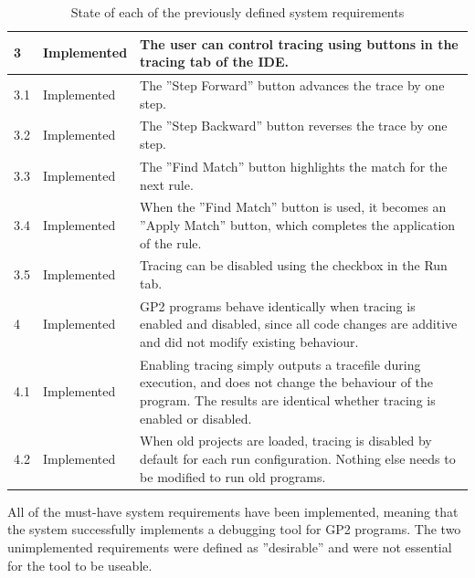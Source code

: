 \documentclass[authoryearcitations]{UoYCSproject}
\begin{document}
\begin{table}[!htb]
\begin{tabularx}{\linewidth}{|l|l|X|}
        3    &  Implemented     & The user can control tracing using buttons in the tracing
                                  tab of the IDE. \\ \hline
        3.1  &  Implemented     & The ''Step Forward'' button advances the trace by one
                                  step. \\ \hline
        3.2  &  Implemented     & The ''Step Backward'' button reverses the trace by one
                                  step. \\ \hline
        3.3  &  Implemented     & The ''Find Match'' button highlights the match for the
                                  next rule. \\ \hline
        3.4  &  Implemented     & When the ''Find Match'' button is used, it becomes an
                                  ''Apply Match'' button, which completes the application
                                  of the rule. \\ \hline
        3.5  &  Implemented     & Tracing can be disabled using the checkbox in the Run tab.
                                  \\ \hline
                
        4    &  Implemented     & GP2 programs behave identically when tracing is enabled
                                  and disabled, since all code changes are additive and did
                                  not modify existing behaviour. \\ \hline
        4.1  &  Implemented     & Enabling tracing simply outputs a tracefile during execution,
                                  and does not change the behaviour of the program. The results
                                  are identical whether tracing is enabled or disabled. \\ \hline
        4.2  &  Implemented     & When old projects are loaded, tracing is disabled by
                                  default for each run configuration. Nothing else needs
                                  to be modified to run old programs. \\ \hline
                
    \end{tabularx}
    \caption{State of each of the previously defined system requirements}
    \label{tab:RequirementsTracing}
\end{table}

All of the must-have system requirements have been implemented, meaning that the
system successfully implements a debugging tool for GP2 programs. The two
unimplemented requirements were defined as ''desirable'' and were not essential
for the tool to be useable.
\end{document}
